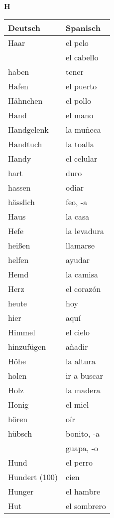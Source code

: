 \begin{flushright}\begin{Huge}\textbf{H}\end{Huge}\end{flushright}

\begin{longtable}{p{} p{}} 
\textbf{Deutsch}     & \textbf{Spanisch}                                       \\ \hline
\hline
\endhead %
Haar & el pelo\\
~ & el cabello\\
haben & tener\\
Hafen & el puerto\\
Hähnchen & el pollo\\
Hand & el mano\\
Handgelenk & la muñeca\\
Handtuch & la toalla\\
Handy & el celular\\
hart & duro\\
hassen & odiar\\
hässlich & feo, -a\\
Haus & la casa\\
Hefe & la levadura\\
heißen & llamarse\\
helfen & ayudar\\
Hemd & la camisa\\
Herz  & el corazón \\
heute & hoy\\
hier & aquí\\
Himmel & el cielo\\
hinzufügen & añadir\\
Höhe & la altura \\
holen & ir a buscar\\
Holz & la madera\\
Honig & el miel\\
hören & oír\\
hübsch & bonito, -a\\
~ & guapa, -o\\
Hund & el perro\\
Hundert (100) & cien\\
Hunger & el hambre\\
Hut & el sombrero\\

\end{longtable}
